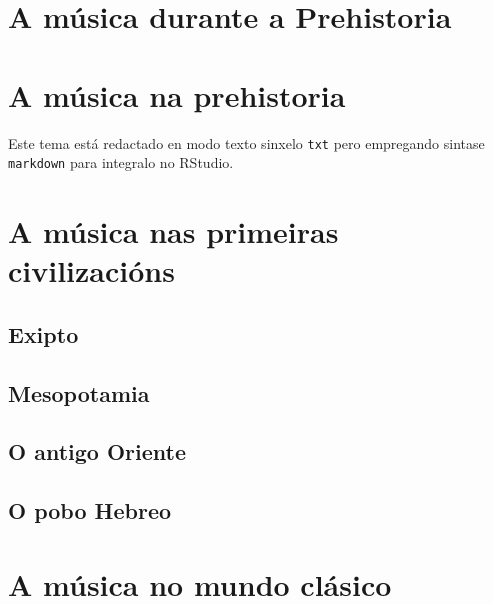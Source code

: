 \documentclass[a4paper, twoside]{templates/ociamthesis}
\begin{document}
\hypertarget{a-muxfasica-durante-a-prehistoria}{%
\section{A música durante a Prehistoria}\label{a-muxfasica-durante-a-prehistoria}}

\hypertarget{a-muxfasica-na-prehistoria}{%
\section{A música na prehistoria}\label{a-muxfasica-na-prehistoria}}

Este tema está redactado en modo texto sinxelo \texttt{txt} pero empregando sintase \texttt{markdown} para integralo no RStudio.

\hypertarget{a-muxfasica-nas-primeiras-civilizaciuxf3ns}{%
\section{A música nas primeiras civilizacións}\label{a-muxfasica-nas-primeiras-civilizaciuxf3ns}}

\hypertarget{exipto}{%
\subsection{Exipto}\label{exipto}}

\hypertarget{mesopotamia}{%
\subsection{Mesopotamia}\label{mesopotamia}}

\hypertarget{o-antigo-oriente}{%
\subsection{O antigo Oriente}\label{o-antigo-oriente}}

\hypertarget{o-pobo-hebreo}{%
\subsection{O pobo Hebreo}\label{o-pobo-hebreo}}

\hypertarget{a-muxfasica-no-mundo-cluxe1sico}{%
\section{A música no mundo clásico}\label{a-muxfasica-no-mundo-cluxe1sico}}
\end{document}
